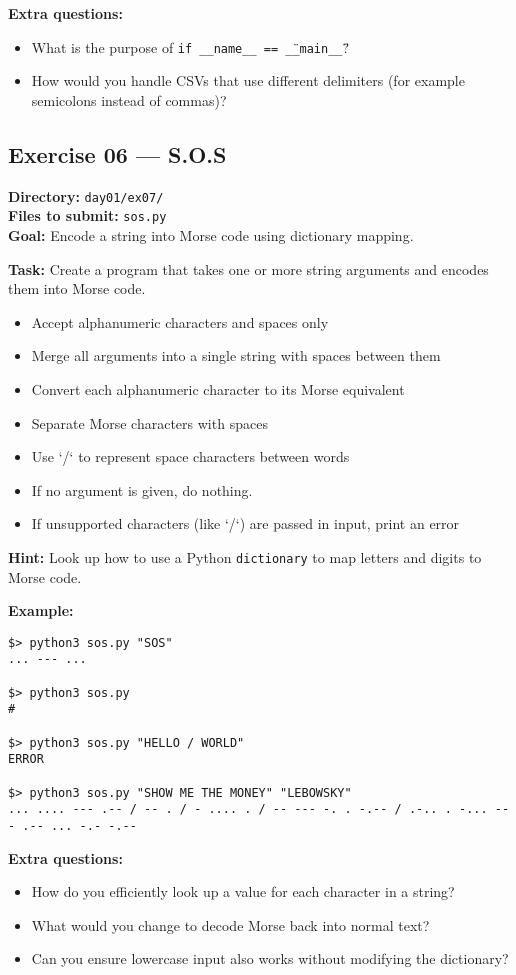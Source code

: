\documentclass[12pt,a4paper]{article}
\begin{document}
\textbf{Extra questions:}
\begin{itemize}
  \item What is the purpose of \texttt{if \_\_name\_\_ == \"\_\_main\_\_\"}?
  \item How would you handle CSVs that use different delimiters (for example semicolons instead of commas)?
\end{itemize}

\newpage
\subsection*{Exercise 06 — S.O.S}
\textbf{Directory:} \texttt{day01/ex07/}\\
\textbf{Files to submit:} \texttt{sos.py}\\
\textbf{Goal:} Encode a string into Morse code using dictionary mapping.

\textbf{Task:} Create a program that takes one or more string arguments and encodes them into Morse code.
\begin{itemize}
  \item Accept alphanumeric characters and spaces only
  \item Merge all arguments into a single string with spaces between them
  \item Convert each alphanumeric character to its Morse equivalent
  \item Separate Morse characters with spaces
  \item Use `/` to represent space characters between words
  \item If no argument is given, do nothing.
  \item If unsupported characters (like `/`) are passed in input, print an error
\end{itemize}

\textbf{Hint:} Look up how to use a Python \texttt{dictionary} to map letters and digits to Morse code.

\textbf{Example:}
\begin{lstlisting}
$> python3 sos.py "SOS"
... --- ...

$> python3 sos.py
#

$> python3 sos.py "HELLO / WORLD"
ERROR

$> python3 sos.py "SHOW ME THE MONEY" "LEBOWSKY"
... .... --- .-- / -- . / - .... . / -- --- -. . -.-- / .-.. . -... --- .-- ... -.- -.--  
\end{lstlisting}

\textbf{Extra questions:}
\begin{itemize}
  \item How do you efficiently look up a value for each character in a string?
  \item What would you change to decode Morse back into normal text?
  \item Can you ensure lowercase input also works without modifying the dictionary?
\end{itemize}
\end{document}
